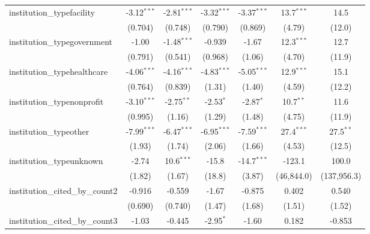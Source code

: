 \begin{tabular}{lcccccc}
   institution\_typefacility             & -3.12$^{***}$ & -2.81$^{***}$ & -3.32$^{***}$ & -3.37$^{***}$ & 13.7$^{***}$ & 14.5\\   
                                         & (0.704)       & (0.748)       & (0.790)       & (0.869)       & (4.79)       & (12.0)\\   
   institution\_typegovernment           & -1.00         & -1.48$^{***}$ & -0.939        & -1.67         & 12.3$^{***}$ & 12.7\\   
                                         & (0.791)       & (0.541)       & (0.968)       & (1.06)        & (4.70)       & (11.9)\\   
   institution\_typehealthcare           & -4.06$^{***}$ & -4.16$^{***}$ & -4.83$^{***}$ & -5.05$^{***}$ & 12.9$^{***}$ & 15.1\\   
                                         & (0.764)       & (0.839)       & (1.31)        & (1.40)        & (4.59)       & (12.2)\\   
   institution\_typenonprofit            & -3.10$^{***}$ & -2.75$^{**}$  & -2.53$^{*}$   & -2.87$^{*}$   & 10.7$^{**}$  & 11.6\\   
                                         & (0.995)       & (1.16)        & (1.29)        & (1.48)        & (4.75)       & (11.9)\\   
   institution\_typeother                & -7.99$^{***}$ & -6.47$^{***}$ & -6.95$^{***}$ & -7.59$^{***}$ & 27.4$^{***}$ & 27.5$^{**}$\\   
                                         & (1.93)        & (1.74)        & (2.06)        & (1.66)        & (4.53)       & (12.5)\\   
   institution\_typeunknown              & -2.74         & 10.6$^{***}$  & -15.8         & -14.7$^{***}$ & -123.1       & 100.0\\   
                                         & (1.82)        & (1.67)        & (18.8)        & (3.87)        & (46,844.0)   & (137,956.3)\\   
   institution\_cited\_by\_count2        & -0.916        & -0.559        & -1.67         & -0.875        & 0.402        & 0.540\\   
                                         & (0.690)       & (0.740)       & (1.47)        & (1.68)        & (1.51)       & (1.52)\\   
   institution\_cited\_by\_count3        & -1.03         & -0.445        & -2.95$^{*}$   & -1.60         & 0.182        & -0.853\\   

\end{tabular}
